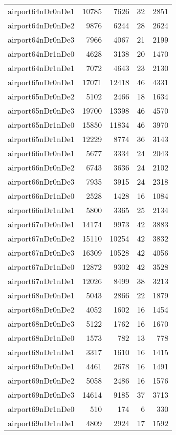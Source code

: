 \begin{longtable}{lrrrr}
airport64nDr0nDe1 & 10785 & 7626 & 32 & 2851 \\
airport64nDr0nDe2 & 9876 & 6244 & 28 & 2624 \\
airport64nDr0nDe3 & 7966 & 4067 & 21 & 2199 \\
airport64nDr1nDe0 & 4628 & 3138 & 20 & 1470 \\
airport64nDr1nDe1 & 7072 & 4643 & 23 & 2130 \\
airport65nDr0nDe1 & 17071 & 12418 & 46 & 4331 \\
airport65nDr0nDe2 & 5102 & 2466 & 18 & 1634 \\
airport65nDr0nDe3 & 19700 & 13398 & 46 & 4570 \\
airport65nDr1nDe0 & 15850 & 11834 & 46 & 3970 \\
airport65nDr1nDe1 & 12229 & 8774 & 36 & 3143 \\
airport66nDr0nDe1 & 5677 & 3334 & 24 & 2043 \\
airport66nDr0nDe2 & 6743 & 3636 & 24 & 2102 \\
airport66nDr0nDe3 & 7935 & 3915 & 24 & 2318 \\
airport66nDr1nDe0 & 2528 & 1428 & 16 & 1084 \\
airport66nDr1nDe1 & 5800 & 3365 & 25 & 2134 \\
airport67nDr0nDe1 & 14174 & 9973 & 42 & 3883 \\
airport67nDr0nDe2 & 15110 & 10254 & 42 & 3832 \\
airport67nDr0nDe3 & 16309 & 10528 & 42 & 4056 \\
airport67nDr1nDe0 & 12872 & 9302 & 42 & 3528 \\
airport67nDr1nDe1 & 12026 & 8499 & 38 & 3213 \\
airport68nDr0nDe1 & 5043 & 2866 & 22 & 1879 \\
airport68nDr0nDe2 & 4052 & 1602 & 16 & 1454 \\
airport68nDr0nDe3 & 5122 & 1762 & 16 & 1670 \\
airport68nDr1nDe0 & 1573 & 782 & 13 & 778 \\
airport68nDr1nDe1 & 3317 & 1610 & 16 & 1415 \\
airport69nDr0nDe1 & 4461 & 2678 & 16 & 1491 \\
airport69nDr0nDe2 & 5058 & 2486 & 16 & 1576 \\
airport69nDr0nDe3 & 14614 & 9185 & 37 & 3713 \\
airport69nDr1nDe0 & 510 & 174 & 6 & 330 \\
airport69nDr1nDe1 & 4809 & 2924 & 17 & 1592 \\

\end{longtable}
